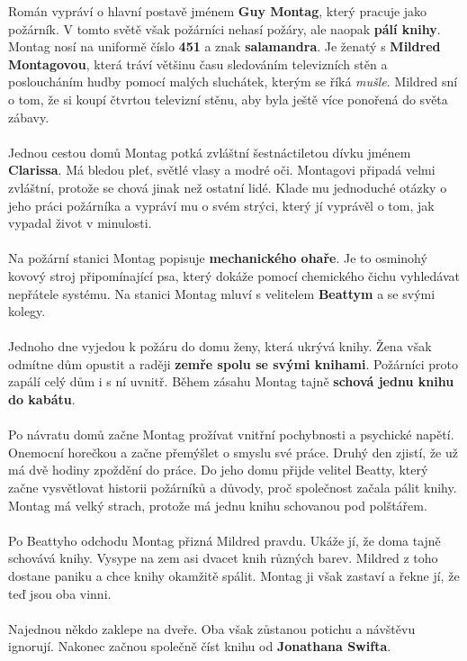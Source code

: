 \documentclass[12pt,a4paper]{article}
\begin{document}
Román vypráví o hlavní postavě jménem \textbf{Guy Montag}, který pracuje jako požárník. V tomto světě však požárníci nehasí požáry, ale naopak \textbf{pálí knihy}. Montag nosí na uniformě číslo \textbf{451} a znak \textbf{salamandra}. Je ženatý s \textbf{Mildred Montagovou}, která tráví většinu času sledováním televizních stěn a posloucháním hudby pomocí malých sluchátek, kterým se říká \textit{mušle}. Mildred sní o tom, že si koupí čtvrtou televizní stěnu, aby byla ještě více ponořená do světa zábavy. \\
\\
Jednou cestou domů Montag potká zvláštní šestnáctiletou dívku jménem \textbf{Clarissa}. Má bledou pleť, světlé vlasy a modré oči. Montagovi připadá velmi zvláštní, protože se chová jinak než ostatní lidé. Klade mu jednoduché otázky o jeho práci požárníka a vypráví mu o svém strýci, který jí vyprávěl o tom, jak vypadal život v minulosti. \\
\\
Na požární stanici Montag popisuje \textbf{mechanického ohaře}. Je to osminohý kovový stroj připomínající psa, který dokáže pomocí chemického čichu vyhledávat nepřátele systému. Na stanici Montag mluví s velitelem \textbf{Beattym} a se svými kolegy. \\
\\
Jednoho dne vyjedou k požáru do domu ženy, která ukrývá knihy. Žena však odmítne dům opustit a raději \textbf{zemře spolu se svými knihami}. Požárníci proto zapálí celý dům i s ní uvnitř. Během zásahu Montag tajně \textbf{schová jednu knihu do kabátu}.\\
\\
Po návratu domů začne Montag prožívat vnitřní pochybnosti a psychické napětí. Onemocní horečkou a začne přemýšlet o smyslu své práce. Druhý den zjistí, že už má dvě hodiny zpoždění do práce. Do jeho domu přijde velitel Beatty, který začne vysvětlovat historii požárníků a důvody, proč společnost začala pálit knihy. Montag má velký strach, protože má jednu knihu schovanou pod polštářem. \\
 \\
Po Beattyho odchodu Montag přizná Mildred pravdu. Ukáže jí, že doma tajně schovává knihy. Vysype na zem asi dvacet knih různých barev. Mildred z toho dostane paniku a chce knihy okamžitě spálit. Montag ji však zastaví a řekne jí, že teď jsou oba vinni. \\
 \\
Najednou někdo zaklepe na dveře. Oba však zůstanou potichu a návštěvu ignorují. Nakonec začnou společně číst knihu od \textbf{Jonathana Swifta}. \\
\end{document}
